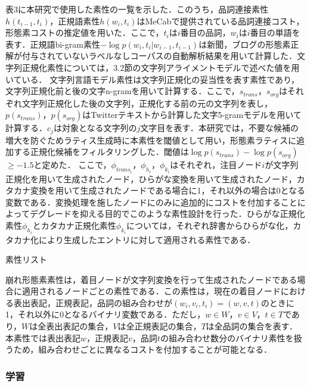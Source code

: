 \documentclass[japanese]{jnlp_1.4}
\begin{document}
表3に本研究で使用した素性の一覧を示した．このうち，品詞連接素性$h(t_{i-1},t_i)$，正規語素性$h(w_i,t_i)$はMeCabで提供されている品詞連接コスト，形態素コストの推定値を用いた．ここで，$t_i$は$i$番目の品詞，$w_i$は$i$番目の単語を表す．正規語bi-gram素性$-\log p(w_i, t_i|w_{i-1}, t_{i-1})$は新聞，ブログの形態素正解が付与されていないラベルなしコーパスの自動解析結果を用いて計算した．文字列正規化素性については，3.2節の文字列アライメントモデルで述べた値を用いている．
文字列言語モデル素性は文字列正規化の妥当性を表す素性であり，文字列正規化前と後の文字n-gramを用いて計算する．ここで，$s_{trans}$，$s_{org}$はそれぞれ文字列正規化した後の文字列，正規化する前の元の文字列を表し，$p(s_{trans})$，$p(s_{org})$はTwitterテキストから計算した文字5-gramモデルを用いて計算する．$c_j$は対象となる文字列の$j$文字目を表す．本研究では，不要な候補の増大を防ぐためラティス生成時に本素性を閾値として用い，形態素ラティスに追加する正規化候補をフィルタリングした．閾値は$\log p(s_{trans})- \log p(s_{org})$ $\geq -1.5$と定めた．
ここで，$\phi_{trans_i}$，$\phi_{h_i}$，$\phi_{k_i}$はそれぞれ，注目ノード$i$が文字列正規化を用いて生成されたノード，ひらがな変換を用いて生成されたノード，カタカナ変換を用いて生成されたノードである場合に1，それ以外の場合は0となる変数である．変換処理を施したノードにのみに追加的にコストを付加することによってデグレードを抑える目的でこのような素性設計を行った．ひらがな正規化素性$\phi_{h_i}$とカタカナ正規化素性$\phi_{k_i}$については，それぞれ辞書からひらがな化，カタカナ化により生成したエントリに対して適用される素性である．

\begin{table}[b]
\caption{素性リスト}

\end{table}

崩れ形態素素性は，着目ノードが文字列変換を行って生成されたノードである場合に適用されるノードごとの素性である．この素性は，現在の着目ノードにおける表出表記，正規表記，品詞の組み合わせが$(w_i, v_i, t_i) = (w, v, t)$のときに1，それ以外に0となるバイナリ変数である．ただし，$w \in W$，$v \in V$，$t \in T$であり，$W$は全表出表記の集合，$V$は全正規表記の集合，$T$は全品詞の集合を表す．本素性では表出表記$w$，正規表記$v$，品詞$t$の組み合わせ数分のバイナリ素性を扱うため，組み合わせごとに異なるコストを付加することが可能となる．


\subsubsection{学習}
\end{document}
